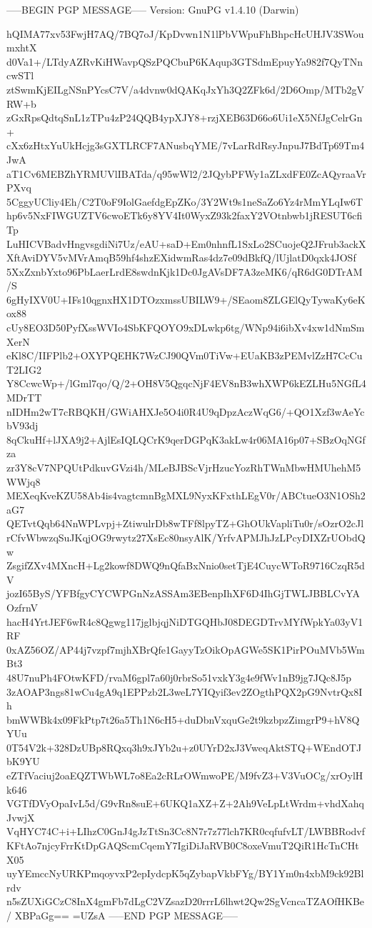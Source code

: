 -----BEGIN PGP MESSAGE-----
Version: GnuPG v1.4.10 (Darwin)

hQIMA77xv53FwjH7AQ/7BQ7oJ/KpDvwn1N1lPbVWpuFhBhpcHcUHJV3SWoumxhtX
d0Va1+/LTdyAZRvKiHWavpQSzPQCbuP6KAqup3GTSdmEpuyYa982f7QyTNncwSTl
ztSwmKjEILgNSnPYcsC7V/a4dvnw0dQAKqJxYh3Q2ZFk6d/2D6Omp/MTb2gVRW+b
zGxRpsQdtqSnL1zTPu4zP24QQB4ypXJY8+rzjXEB63D66o6Ui1eX5NfJgCelrGn+
cXx6zHtxYuUkHcjg3sGXTLRCF7ANusbqYME/7vLarRdRsyJnpuJ7BdTp69Tm4JwA
aT1Cv6MEBZhYRMUVlIBATda/q95wWl2/2JQybPFWy1aZLxdFE0ZcAQyraaVrPXvq
5CggyUCliy4Eh/C2T0oF9IolGaefdgEpZKo/3Y2Wt9s1neSaZo6Yz4rMmYLqIw6T
hp6v5NxFIWGUZTV6cwoETk6y8YV4It0WyxZ93k2faxY2VOtnbwb1jRESUT6cfiTp
LuHICVBadvHngvsgdiNi7Uz/eAU+saD+Em0nhnfL1SxLo2SCuojeQ2JFrub3ackX
XftAviDYV5vMVrAmqB59hf4shzEXidwmRas4dz7e09dBkfQ/lUjlatD0qxk4JOSf
5XxZxnbYxto96PbLaerLrdE8swdnKjk1Dc0JgAVsDF7A3zeMK6/qR6dG0DTrAM/S
6gHyIXV0U+IFs10qgnxHX1DTOzxmssUBILW9+/SEaom8ZLGElQyTywaKy6eKox88
cUy8EO3D50PyfXssWVIo4SbKFQOYO9xDLwkp6tg/WNp94i6ibXv4xw1dNmSmXerN
eKl8C/IIFPlb2+OXYPQEHK7WzCJ90QVm0TiVw+EUaKB3zPEMvlZzH7CcCuT2LIG2
Y8CcwcWp+/lGml7qo/Q/2+OH8V5QgqcNjF4EV8nB3whXWP6kEZLHu5NGfL4MDrTT
nIDHm2wT7cRBQKH/GWiAHXJe5O4i0R4U9qDpzAczWqG6/+QO1Xzf3wAeYcbV93dj
8qCkuHf+lJXA9j2+AjlEsIQLQCrK9qerDGPqK3akLw4r06MA16p07+SBzOqNGfza
zr3Y8cV7NPQUtPdkuvGVzi4h/MLeBJBScVjrHzucYozRhTWnMbwHMUhehM5WWjq8
MEXeqKveKZU58Ab4is4vagtcmnBgMXL9NyxKFxthLEgV0r/ABCtueO3N1OSh2aG7
QETvtQqb64NnWPLvpj+ZtiwulrDb8wTFf8lpyTZ+GhOUkVapliTu0r/sOzrO2cJl
rCfvWbwzqSuJKqjOG9rwytz27XsEc80nsyAlK/YrfvAPMJhJzLPcyDIXZrUObdQw
ZsgifZXv4MXncH+Lg2kowf8DWQ9nQfaBxNnio0setTjE4CuycWToR9716CzqR5dV
jozI65ByS/YFBfgyCYCWPGnNzASSAm3EBenpIhXF6D4IhGjTWLJBBLCvYAOzfrnV
hacH4YrtJEF6wR4c8Qgwg117jglbjqjNiDTGQHbJ08DEGDTrvMYfWpkYa03yV1RF
0xAZ56OZ/AP44j7vzpf7mjhXBrQfe1GayyTzOikOpAGWe5SK1PirPOuMVb5WmBt3
48U7nuPh4FOtwKFD/rvaM6gpl7a60j0rbrSo51vxkY3g4e9fWv1nB9jg7JQc8J5p
3zAOAP3ngs81wCu4gA9q1EPPzb2L3weL7YIQyif3ev2ZOgthPQX2pG9NvtrQx8Ih
bmWWBk4x09FkPtp7t26a5Th1N6cH5+duDbnVxquGe2t9kzbpzZimgrP9+hV8QYUu
0T54V2k+328DzUBp8RQxq3h9xJYb2u+z0UYrD2xJ3VweqAktSTQ+WEndOTJbK9YU
eZTfVaciuj2oaEQZTWbWL7o8Ea2cRLrOWmwoPE/M9fvZ3+V3VuOCg/xrOylHk646
VGTfDVyOpaIvL5d/G9vRn8suE+6UKQ1aXZ+Z+2Ah9VeLpLtWrdm+vhdXahqJvwjX
VqHYC74C+i+LIhzC0GnJ4gJzTtSn3Cc8N7r7z77lch7KR0cqfufvLT/LWBBRodvf
KFtAo7njcyFrrKtDpGAQScmCqemY7IgiDiJaRVB0C8oxeVmuT2QiR1HcTnCHtX05
uyYEmccNyURKPmqoyvxP2epIydcpK5qZybapVkbFYg/BY1Ym0n4xbM9ck92Blrdv
n5sZUXiGCzC8InX4gmFb7dLgC2VZsazD20rrrL6lhwt2Qw2SgVcncaTZAOfHKBe/
XBPaGg==
=UZsA
-----END PGP MESSAGE-----
